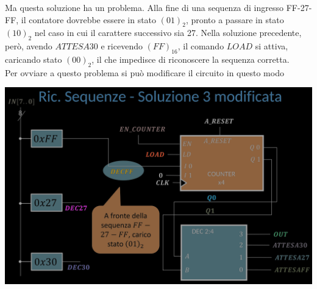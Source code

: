 \documentclass{article}
\begin{document}
Ma questa soluzione ha un problema.
Alla fine di una sequenza di ingresso FF-27-FF, il contatore dovrebbe essere in stato $(01)_2$, pronto a passare in stato $(10)_2$ nel caso in cui il carattere successivo sia 27. Nella soluzione precedente, però, avendo $ATTESA30 $ e ricevendo $(FF)_{16}$, il comando $LOAD$ si attiva, caricando stato $(00)_2$, il che impedisce di riconoscere la sequenza corretta.
\vspace{0.2cm}\\
Per ovviare a questo problema si può modificare il circuito in questo modo
\begin{center}
    \includegraphics[scale=0.4]{sol 3 mod.png}
\end{center}
\end{document}
